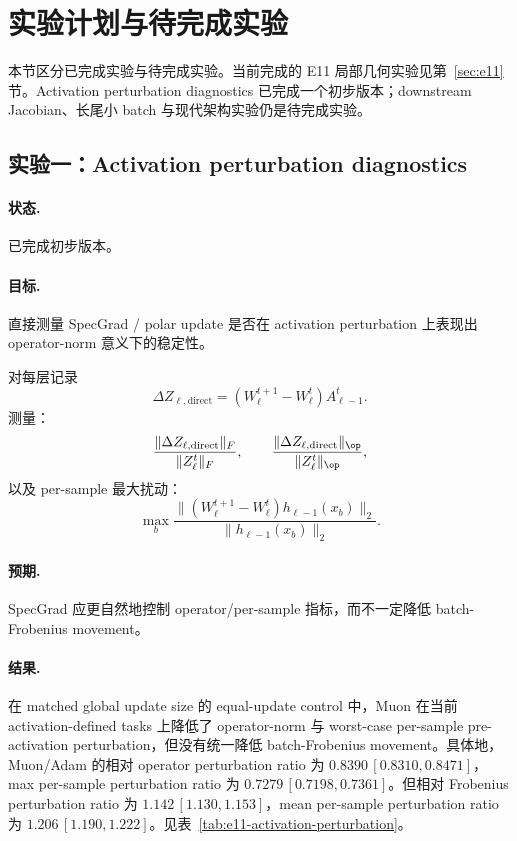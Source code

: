 \section{实验计划与待完成实验}
\label{sec:experiments-tbd}

本节区分已完成实验与待完成实验。当前完成的 E11 局部几何实验见第~\ref{sec:e11} 节。Activation perturbation diagnostics 已完成一个初步版本；downstream Jacobian、长尾小 batch 与现代架构实验仍是待完成实验。

\subsection{实验一：Activation perturbation diagnostics}

\paragraph{状态.} 已完成初步版本。

\paragraph{目标.} 直接测量 SpecGrad / polar update 是否在 activation perturbation 上表现出 operator-norm 意义下的稳定性。

对每层记录
\[
\Delta Z_{\ell,\mathrm{direct}}
=(W_\ell^{t+1}-W_\ell^t)A_{\ell-1}^t.
\]
测量：
\[
\frac{\|\Delta Z_{\ell,\mathrm{direct}}\|_F}{\|Z_\ell^t\|_F},
\qquad
\frac{\|\Delta Z_{\ell,\mathrm{direct}}\|_{\op}}{\|Z_\ell^t\|_{\op}},
\]
以及 per-sample 最大扰动：
\[
\max_b
\frac{\|(W_\ell^{t+1}-W_\ell^t)h_{\ell-1}(x_b)\|_2}
{\|h_{\ell-1}(x_b)\|_2}.
\]

\paragraph{预期.} SpecGrad 应更自然地控制 operator/per-sample 指标，而不一定降低 batch-Frobenius movement。

\paragraph{结果.}
在 matched global update size 的 equal-update control 中，Muon 在当前 activation-defined tasks 上降低了 operator-norm 与 worst-case per-sample pre-activation perturbation，但没有统一降低 batch-Frobenius movement。具体地，Muon/Adam 的相对 operator perturbation ratio 为 \(0.8390\,[0.8310,0.8471]\)，max per-sample perturbation ratio 为 \(0.7279\,[0.7198,0.7361]\)。但相对 Frobenius perturbation ratio 为 \(1.142\,[1.130,1.153]\)，mean per-sample perturbation ratio 为 \(1.206\,[1.190,1.222]\)。见表~\ref{tab:e11-activation-perturbation}。

